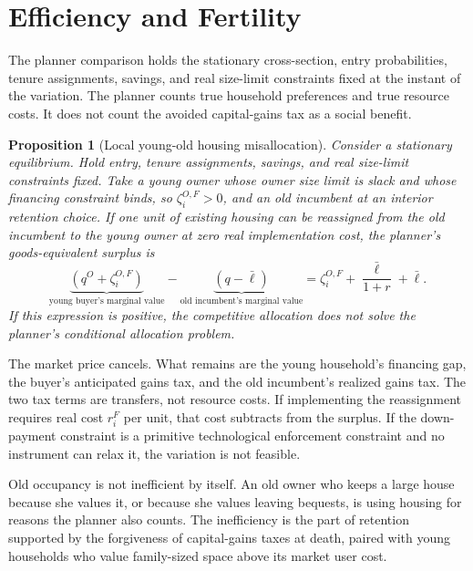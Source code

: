 \documentclass[11pt]{article}
\newtheorem{proposition}{Proposition}
\newcommand{\1}{\mathbf 1}
\begin{document}
\section{Efficiency and Fertility}

The planner comparison holds the stationary cross-section, entry probabilities,
tenure assignments, savings, and real size-limit constraints fixed at the
instant of the variation. The planner counts true household preferences and
true resource costs. It does not count the avoided capital-gains tax as a social
benefit.

\begin{proposition}[Local young-old housing misallocation]
Consider a stationary equilibrium. Hold entry, tenure assignments, savings, and
real size-limit constraints fixed. Take a young owner whose owner size limit is
slack and whose financing constraint binds, so $\zeta_i^{O,F}>0$, and an old
incumbent at an interior retention choice. If one unit of existing housing can
be reassigned from the old incumbent to the young owner at zero real
implementation cost, the planner's goods-equivalent surplus is
\begin{equation}
\underbrace{(q^O+\zeta_i^{O,F})}_{\text{young buyer's marginal value}}
-
\underbrace{(q-\bar\ell)}_{\text{old incumbent's marginal value}}
=
\zeta_i^{O,F}+\frac{\bar\ell}{1+r}+\bar\ell.
\label{eq:compact_efficiency_gap}
\end{equation}
If this expression is positive, the competitive allocation does not solve the
planner's conditional allocation problem.
\end{proposition}

The market price cancels. What remains are the young household's financing gap,
the buyer's anticipated gains tax, and the old incumbent's realized gains tax.
The two tax terms are transfers, not resource costs. If implementing the
reassignment requires real cost $r_i^F$ per unit, that cost subtracts from the
surplus. If the down-payment constraint is a primitive technological
enforcement constraint and no instrument can relax it, the variation is not
feasible.

Old occupancy is not inefficient by itself. An old owner who keeps a large
house because she values it, or because she values leaving bequests, is using
housing for reasons the planner also counts. The inefficiency is the part of
retention supported by the forgiveness of capital-gains taxes at death, paired
with young households who value family-sized space above its market user cost.
\end{document}
